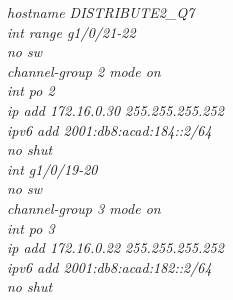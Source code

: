 \documentclass[a4paper, 12pt]{article}
\begin{document}
\hspace*{2cm}\textit{hostname DISTRIBUTE2\_Q7\\
\hspace*{2cm}int range g1/0/21-22\\
\hspace*{2cm}no sw\\
\hspace*{2cm}channel-group 2 mode on\\
\hspace*{2cm}int po 2\\
\hspace*{2cm}ip add 172.16.0.30 255.255.255.252\\
\hspace*{2cm}ipv6 add 2001:db8:acad:184::2/64\\
\hspace*{2cm}no shut\\
\hspace*{2cm}int g1/0/19-20\\
\hspace*{2cm}no sw\\
\hspace*{2cm}channel-group 3 mode on\\
\hspace*{2cm}int po 3\\
\hspace*{2cm}ip add 172.16.0.22 255.255.255.252\\
\hspace*{2cm}ipv6 add 2001:db8:acad:182::2/64\\
\hspace*{2cm}no shut\\}
\end{document}
